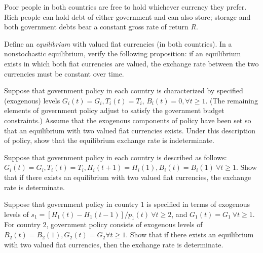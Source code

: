   Poor people in both countries  are free to hold whichever
currency they prefer.  Rich people can hold debt of either
government and can also store; storage and both government debts
bear a  constant gross rate of return $R$.
\medskip

  Define an {\it equilibrium\/} with valued fiat
currencies (in both countries).
\medskip
{}  In a nonstochastic equilibrium, verify the following
proposition: if an equilibrium exists in which both fiat currencies
are valued, the exchange rate between the two currencies must be
constant over time.
\medskip


  Suppose that government policy   in each
country is characterized by specified (exogenous)
levels $G_i(t) = G_i, T_i(t) = T_i$,
$B_i(t) = 0, \forall t \geq 1$. (The remaining elements of government policy
adjust to   satisfy the government budget constraints.)
Assume that the exogenous components of policy have
been set so that an equilibrium with two valued fiat
currencies exists.    Under this
description of policy, show that the equilibrium exchange rate
is indeterminate.

\medskip
{}  Suppose that government policy in each country is
described as follows: $G_i(t)=G_i, T_i(t)=T_i, H_i(t+1)=H_i(1),
B_i(t)=B_i(1) \
 \forall t \geq 1$.
Show that if there exists an equilibrium with two valued fiat
currencies, the exchange rate is determinate.

\medskip

  Suppose that government policy in country
$1$ is specified in terms of exogenous levels of
$s_1 = [H_1(t) - H_1(t-1)]/p_1(t)  \ \forall t \geq 2$,
and $G_1(t)=G_1 \ \forall t \geq 1$.  For country $2$,
government policy consists of exogenous levels
of $B_2(t)= B_2(1), G_2(t) = G_2 \forall t \geq 1$.  Show that if there
exists an equilibrium with two valued fiat currencies, then
the exchange rate is determinate.


\medskip

